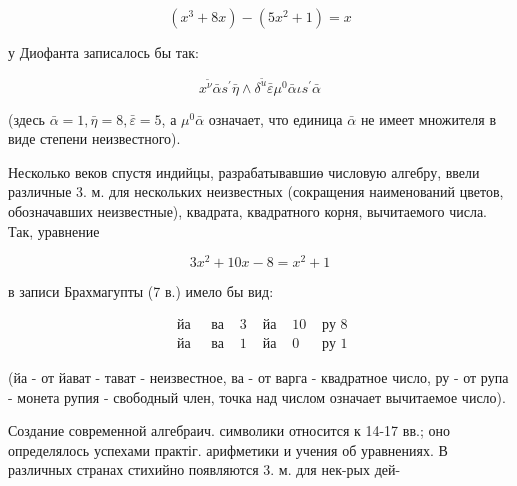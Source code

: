 \documentclass[10pt]{article}
\begin{document}
\[

\left(x^{3}+8 x\right)-\left(5 x^{2}+1\right)=x

\]



у Диофанта записалось бы так:



\[

x^{\tilde{\nu}} \bar{\alpha} s^{\prime} \bar{\eta} \wedge \delta^{\tilde{u}} \bar{\varepsilon} \mu^{0} \bar{\alpha} \iota s^{\prime} \bar{\alpha}

\]



(здесь $\bar{\alpha}=1, \bar{\eta}=8, \bar{\varepsilon}=5$, а $\mu^{0} \bar{\alpha}$ означает, что единица $\bar{\alpha}$ не имеет множителя в виде степени неизвестного).



Несколько веков спустя индийцы, разрабатывавшиө числовую алгебру, ввели различные 3. м. для нескольких неизвестных (сокращения наименований цветов, обозначавших неизвестные), квадрата, квадратного корня, вычитаемого числа. Так, уравнение



\[

3 x^{2}+10 x-8=x^{2}+1

\]



в записи Брахмагупты (7 в.) имело бы вид:



\[

\begin{array}{lllllll}

\text { йа } & \text { ва } & 3 & \text { йа } & 10 & \text { ру } 8 \\

\text { йа } & \text { ва } & 1 & \text { йа } & 0 & \text { ру } 1

\end{array}

\]



(йа - от йават - тават - неизвестное, ва - от варга - квадратное число, ру - от рупа - монета рупия - свободный член, точка над числом означает вычитаемое число).



Создание современной алгебраич. символики относится к 14-17 вв.; оно определялось успехами практіг. арифметики и учения об уравнениях. В различных странах стихийно появляются 3. м. для нек-рых дей-
\end{document}
